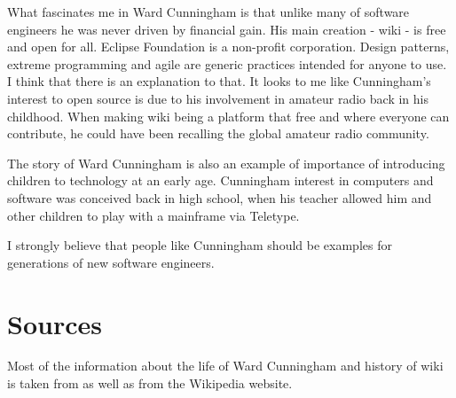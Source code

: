 \documentclass[11pt]{article}
\begin{document}
\par
What fascinates me in Ward Cunningham is that unlike many of software engineers he was never driven by financial gain. His main creation - wiki - is free and open for all. Eclipse Foundation is a non-profit corporation. Design patterns, extreme programming and agile are generic practices intended for anyone to use. I think that there is an explanation to that. It looks to me like Cunningham's interest to open source is due to his involvement in amateur radio back in his childhood. When making wiki being a platform that free and where everyone can contribute, he could have been recalling the global amateur radio community.
\par
The story of Ward Cunningham is also an example of importance of introducing children to technology at an early age. Cunningham interest in computers and software was conceived back in high school, when his teacher allowed him and other children to play with a mainframe via Teletype.

\par


I strongly believe that people like Cunningham should be examples for generations of new software engineers.


\section{Sources}
Most of the information about the life of Ward Cunningham and history of wiki is taken from \cite{innovators} \cite{wiki-revolution} \cite{cs-encyclopedia} as well as from the Wikipedia website.

%

 
\end{document}
